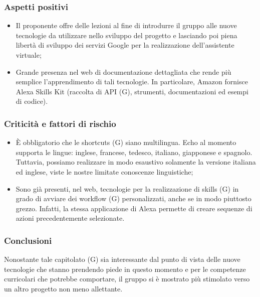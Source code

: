 \documentclass[a4paper, 11pt]{article}
\begin{document}
	\subsubsection{Aspetti positivi}
	\begin{itemize}
		\item Il proponente offre delle lezioni al fine di introdurre il gruppo alle nuove tecnologie da utilizzare nello sviluppo del 				progetto e lasciando poi piena libertà di sviluppo dei servizi Google per la realizzazione dell’assistente virtuale;
		\item Grande presenza nel web di documentazione dettagliata che rende più semplice l’apprendimento di tali tecnologie. In 			particolare, Amazon fornisce Alexa Skills Kit (raccolta di API (G), strumenti, documentazioni ed esempi di codice).
	\end{itemize}
	\subsubsection{Criticità e fattori di rischio}
	\begin{itemize}
		\item È obbligatorio che le shortcuts (G) siano multilingua. Echo al momento supporta le lingue: inglese, francese, tedesco, 			italiano, giapponese e spagnolo. Tuttavia, possiamo realizzare in modo esaustivo solamente la versione italiana ed inglese, 			viste le nostre limitate conoscenze linguistiche;
		\item Sono già presenti, nel web, tecnologie per la realizzazione di skills (G) in grado di avviare dei workflow (G) 					personalizzati, anche se in modo piuttosto grezzo. Infatti, la stessa applicazione di Alexa permette di creare sequenze di 			azioni precedentemente selezionate.
	\end{itemize}
	\subsubsection{Conclusioni}
		Nonostante tale capitolato (G) sia interessante dal punto di vista delle nuove tecnologie che stanno prendendo piede in 				questo momento e per le competenze curricolari che potrebbe comportare, il gruppo si è mostrato più stimolato verso un 			altro progetto non meno allettante.
	
\end{document}
